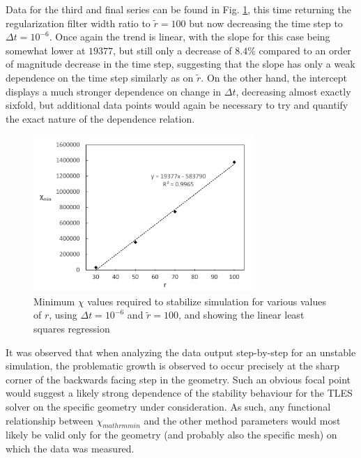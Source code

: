 Data for the third and final series can be found in Fig. \ref{fig:min_chi_dt6_r100}, this time returning the regularization filter width ratio to $\tilde{r}=100$ but now decreasing the time step to $\Delta t=10^{-6}$. Once again the trend is linear, with the slope for this case being somewhat lower at $19377$, but still only a decrease of $8.4\%$  compared to an order of magnitude decrease in the time step, suggesting that the slope has only a weak dependence on the time step similarly as on $\tilde{r}$. On the other hand, the intercept displays a much stronger dependence on change in $\Delta t$, decreasing almost exactly sixfold, but additional data points would again be necessary to try and quantify the exact nature of the dependence relation.

\begin{figure}[!t]
\centering
\includegraphics[width=0.75\textwidth]{figures/min_chi_dt6_r100.pdf}
\caption{Minimum $\chi$ values required to stabilize simulation for various values of $r$, using $\Delta t=10^{-6}$ and $\tilde{r}=100$, and showing the linear least squares regression}
\label{fig:min_chi_dt6_r100}
\end{figure}

It was observed that when analyzing the data output step-by-step for an unstable simulation, the problematic growth is observed to occur precisely at the sharp corner of the backwards facing step in the geometry. Such an obvious focal point would suggest a likely strong dependence of the stability behaviour for the TLES solver on the specific geometry under consideration. As such, any functional relationship between $\chi_{mathrm{min}}$ and the other method parameters would most likely be valid only for the geometry (and probably also the specific mesh) on which the data was measured.

